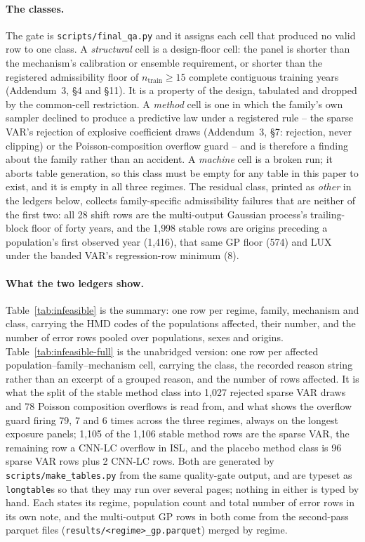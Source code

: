 \paragraph{The classes.} The gate is \texttt{scripts/final\_qa.py} and it assigns
each cell that produced no valid row to one class. A \emph{structural} cell is a
design-floor cell: the panel is shorter than the mechanism's calibration or
ensemble requirement, or shorter than the registered admissibility floor of
$n_{\text{train}}\ge 15$ complete contiguous training years (Addendum~3, \S4 and
\S11). It is a property of the design, tabulated and dropped by the common-cell
restriction. A \emph{method} cell is one in which the family's own sampler
declined to produce a predictive law under a registered rule -- the sparse VAR's
rejection of explosive coefficient draws (Addendum~3, \S7: rejection, never
clipping) or the Poisson-composition overflow guard -- and is therefore a finding
about the family rather than an accident. A \emph{machine} cell is a broken run;
it aborts table generation, so this class must be empty for any table in this
paper to exist, and it is empty in all three regimes. The residual class, printed
as \emph{other} in the ledgers below, collects family-specific admissibility
failures that are neither of the first two: all 28 shift rows are the
multi-output Gaussian process's trailing-block floor of forty years, and the
1{,}998 stable rows are origins preceding a population's first observed year
(1{,}416), that same GP floor (574) and LUX under the banded VAR's
regression-row minimum (8).

\paragraph{What the two ledgers show.} Table~\ref{tab:infeasible} is the summary:
one row per regime, family, mechanism and class, carrying the HMD codes of the
populations affected, their number, and the number of error rows pooled over
populations, sexes and origins. Table~\ref{tab:infeasible-full} is the
unabridged version: one row per affected population--family--mechanism cell,
carrying the class, the recorded reason string rather than an excerpt of a
grouped reason, and the number of rows affected. It is what the split of the
stable method class into 1{,}027 rejected sparse VAR draws and 78 Poisson
composition overflows is read from, and what shows the overflow guard firing 79,
7 and 6 times across the three regimes, always on the longest exposure panels;
1{,}105 of the 1{,}106 stable method rows are the sparse VAR, the remaining row a
CNN-LC overflow in ISL, and the placebo method class is 96 sparse VAR rows plus
2 CNN-LC rows. Both are generated by \texttt{scripts/make\_tables.py} from the
same quality-gate output, and are typeset as \texttt{longtable}s so that they may
run over several pages; nothing in either is typed by hand. Each states its
regime, population count and total number of error rows in its own note, and the
multi-output GP rows in both come from the second-pass parquet files
(\texttt{results/<regime>\_gp.parquet}) merged by regime.

